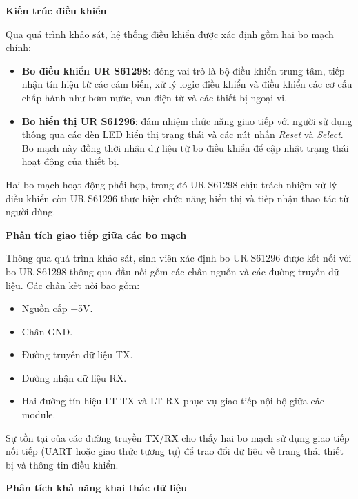 \vspace{0.5em}

\textbf{Kiến trúc điều khiển}

Qua quá trình khảo sát, hệ thống điều khiển được xác định gồm hai bo mạch chính:

\begin{itemize}
    \item \textbf{Bo điều khiển UR S61298}: đóng vai trò là bộ điều khiển trung tâm, tiếp nhận tín hiệu từ các cảm biến, xử lý logic điều khiển và điều khiển các cơ cấu chấp hành như bơm nước, van điện từ và các thiết bị ngoại vi.
    
    \item \textbf{Bo hiển thị UR S61296}: đảm nhiệm chức năng giao tiếp với người sử dụng thông qua các đèn LED hiển thị trạng thái và các nút nhấn \textit{Reset} và \textit{Select}. Bo mạch này đồng thời nhận dữ liệu từ bo điều khiển để cập nhật trạng thái hoạt động của thiết bị.
\end{itemize}

Hai bo mạch hoạt động phối hợp, trong đó UR S61298 chịu trách nhiệm xử lý điều khiển còn UR S61296 thực hiện chức năng hiển thị và tiếp nhận thao tác từ người dùng.

\vspace{0.5em}

\textbf{Phân tích giao tiếp giữa các bo mạch}

Thông qua quá trình khảo sát, sinh viên xác định bo UR S61296 được kết nối với bo UR S61298 thông qua đầu nối gồm các chân nguồn và các đường truyền dữ liệu. Các chân kết nối bao gồm:

\begin{itemize}
    \item Nguồn cấp +5V.
    \item Chân GND.
    \item Đường truyền dữ liệu TX.
    \item Đường nhận dữ liệu RX.
    \item Hai đường tín hiệu LT-TX và LT-RX phục vụ giao tiếp nội bộ giữa các module.
\end{itemize}

Sự tồn tại của các đường truyền TX/RX cho thấy hai bo mạch sử dụng giao tiếp nối tiếp (UART hoặc giao thức tương tự) để trao đổi dữ liệu về trạng thái thiết bị và thông tin điều khiển.

\vspace{0.5em}

\textbf{Phân tích khả năng khai thác dữ liệu}

